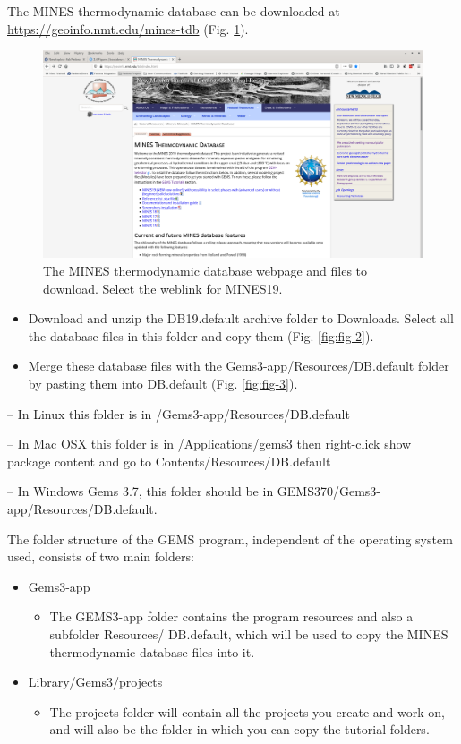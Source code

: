 \documentclass[
]{book}
\providecommand{\tightlist}{%
  \setlength{\itemsep}{0pt}\setlength{\parskip}{0pt}}
\begin{document}
The MINES thermodynamic database can be downloaded at \url{https://geoinfo.nmt.edu/mines-tdb} (Fig. \ref{fig:fig-1}).

\begin{figure}
\includegraphics[width=0.9\linewidth]{figures/module1/fig-1} \caption{The MINES thermodynamic database webpage and files to download. Select the weblink for MINES19.}\label{fig:fig-1}
\end{figure}

\begin{itemize}
\item
  Download and unzip the DB19.default archive folder to Downloads. Select all the database files in this folder and copy them (Fig. \ref{fig:fig-2}).
\item
  Merge these database files with the Gems3-app/Resources/DB.default folder by pasting them into DB.default (Fig. \ref{fig:fig-3}).
\end{itemize}

-- In Linux this folder is in /Gems3-app/Resources/DB.default

-- In Mac OSX this folder is in /Applications/gems3 then right-click show package content and go to Contents/Resources/DB.default

-- In Windows Gems 3.7, this folder should be in GEMS370/Gems3-app/Resources/DB.default.

The folder structure of the GEMS program, independent of the operating system used, consists of two main folders:

\begin{itemize}
\tightlist
\item
  Gems3-app

  \begin{itemize}
  \tightlist
  \item
    The GEMS3-app folder contains the program resources and also a subfolder Resources/ DB.default, which will be used to copy the MINES thermodynamic database files into it.
  \end{itemize}
\item
  Library/Gems3/projects

  \begin{itemize}
  \tightlist
  \item
    The projects folder will contain all the projects you create and work on, and will also be the folder in which you can copy the tutorial folders.
  \end{itemize}
\end{itemize}
\end{document}
